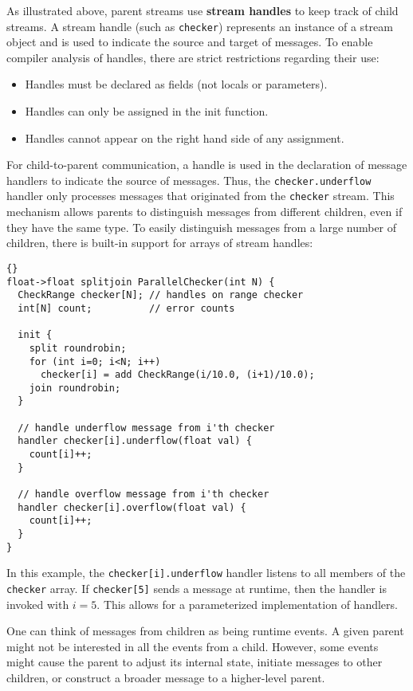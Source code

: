 As illustrated above, parent streams use {\bf stream handles} to keep
track of child streams.  A stream handle (such as \lstinline|checker|)
represents an instance of a stream object and is used to indicate the
source and target of messages.  To enable compiler analysis of
handles, there are strict restrictions regarding their use:
\begin{itemize}
\item Handles must be declared as fields (not locals or parameters).
\item Handles can only be assigned in the init function.
\item Handles cannot appear on the right hand side of any assignment.
\end{itemize}

For child-to-parent communication, a handle is used in the declaration
of message handlers to indicate the source of messages.  Thus, the
\lstinline|checker.underflow| handler only processes messages that
originated from the \lstinline|checker| stream.  This mechanism allows
parents to distinguish messages from different children, even if they
have the same type.  To easily distinguish messages from a large
number of children, there is built-in support for arrays of stream
handles:

\begin{lstlisting}{}
float->float splitjoin ParallelChecker(int N) {
  CheckRange checker[N]; // handles on range checker
  int[N] count;          // error counts

  init {
    split roundrobin;
    for (int i=0; i<N; i++)
      checker[i] = add CheckRange(i/10.0, (i+1)/10.0);
    join roundrobin;
  }

  // handle underflow message from i'th checker
  handler checker[i].underflow(float val) {
    count[i]++;
  }

  // handle overflow message from i'th checker
  handler checker[i].overflow(float val) {
    count[i]++;
  }
}
\end{lstlisting}{}

In this example, the \lstinline|checker[i].underflow| handler listens
to all members of the \lstinline|checker| array.  If
\lstinline|checker[5]| sends a message at runtime, then the handler is
invoked with $i=5$.  This allows for a parameterized implementation of
handlers.

One can think of messages from children as being runtime events.  A
given parent might not be interested in all the events from a child.
However, some events might cause the parent to adjust its internal
state, initiate messages to other children, or construct a broader
message to a higher-level parent.

